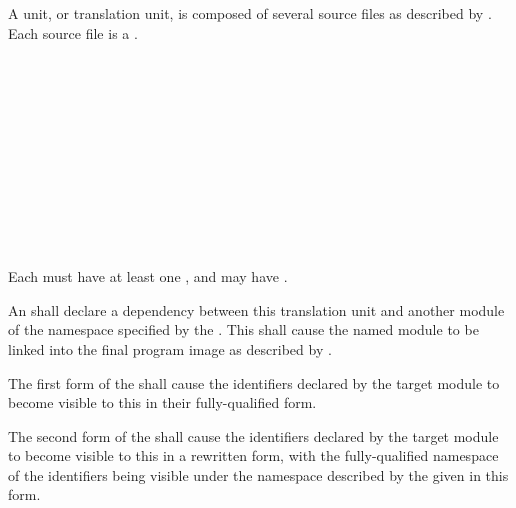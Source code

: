 \newpage
{}

\specsubsubitem
A unit, or translation unit, is composed of several source files as described
by . Each source file is a .

\begin{grammar}
	\\
	 \\

	\\
	 \\

	  \terminal{;}\\
	  \terminal{=}  \terminal{;}\\
	  \terminal{::} \terminal{\{}  \terminal{\}} \terminal{;}\\

	\\
	 \terminal{,}\\
	 \terminal{,} \\
\end{grammar}

\specsubsubitem
Each  must have at least one ,
and may have .

\specsubsubitem
An  shall declare a dependency between this translation
unit and another module of the namespace specified by the
 . This shall cause the named
module to be linked into the final program image as described by
.

\specsubsubitem
The first form of the  shall cause the identifiers
declared by the target module to become visible to this 
in their fully-qualified form.

\specsubsubitem
The second form of the  shall cause the identifiers
declared by the target module to become visible to this 
in a rewritten form, with the fully-qualified namespace of the identifiers
being visible under the namespace described by the  given in
this form.

